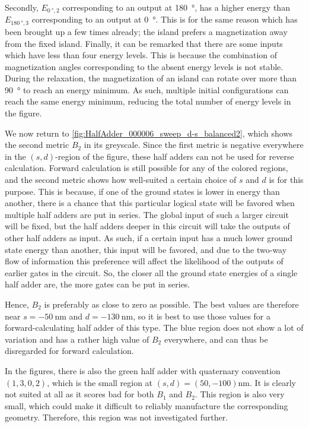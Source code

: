 \documentclass[11pt,a4paper,english,twoside]{article}
\begin{document}
Secondly, $E_{\SI{0}{\degree}, 2}$ corresponding to an output at \SI{180}{\degree}, has a higher energy than $E_{\SI{180}{\degree}, 3}$ corresponding to an output at \SI{0}{\degree}. This is for the same reason which has been brought up a few times already; the island prefers a magnetization away from the fixed island.
Finally, it can be remarked that there are some inputs which have less than four energy levels. This is because the combination of magnetization angles corresponding to the absent energy levels is not stable. During the relaxation, the magnetization of an island can rotate over more than \SI{90}{\degree} to reach an energy minimum. As such, multiple initial configurations can reach the same energy minimum, reducing the total number of energy levels in the figure. \par

We now return to \cref{fig:HalfAdder_000006_sweep_d-s_balanced2}, which shows the second metric $B_2$ in its greyscale. Since the first metric is negative everywhere in the $(s,d)$-region of the figure, these half adders can not be used for reverse calculation. Forward calculation is still possible for any of the colored regions, and the second metric shows how well-suited a certain choice of $s$ and $d$ is for this purpose. This is because, if one of the ground states is lower in energy than another, there is a chance that this particular logical state will be favored when multiple half adders are put in series. The global input of such a larger circuit will be fixed, but the half adders deeper in this circuit will take the outputs of other half adders as input. As such, if a certain input has a much lower ground state energy than another, this input will be favored, and due to the two-way flow of information this preference will affect the likelihood of the outputs of earlier gates in the circuit. So, the closer all the ground state energies of a single half adder are, the more gates can be put in series. \par
Hence, $B_2$ is preferably as close to zero as possible. The best values are therefore near $s=\SI{-50}{\nano\metre}$ and $d=\SI{-130}{\nano\metre}$, so it is best to use those values for a forward-calculating half adder of this type. The blue region does not show a lot of variation and has a rather high value of $B_2$ everywhere, and can thus be disregarded for forward calculation.

In the figures, there is also the green half adder with quaternary convention $(1,3,0,2)$, which is the small region at $(s,d) = (50, -100) \si{\nano\metre}$. It is clearly not suited at all as it scores bad for both $B_1$ and $B_2$. This region is also very small, which could make it difficult to reliably manufacture the corresponding geometry. Therefore, this region was not investigated further.
\end{document}

